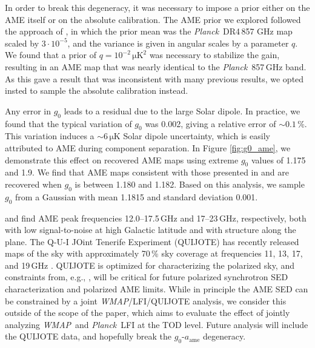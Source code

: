 \documentclass[twocolumn]{../../common/aa}
\def\WMAP{\emph{WMAP}}
\def\Planck{\emph{Planck}}
\begin{document}
In order to break this degeneracy, it was necessary to impose a prior either on the AME itself or on the absolute calibration. The AME prior we explored followed the approach of \citet{bp13}, in which the prior mean was the \Planck\ DR4\,857 GHz map scaled by $3\cdot10^{-5}$, and the variance is given in angular scales by a parameter $q$. We found that a prior of $q=10^{-2}\,\mathrm{\mu K}^2$ was necessary to stabilize the gain, resulting in an AME map that was nearly identical to the \Planck\ 857\,GHz band. As this gave a result that was inconsistent with many previous results, we opted insted to sample the absolute calibration instead.

Any error in $g_0$ leads to a residual due to the large Solar dipole. In practice, we found that the typical variation of $g_0$ was 0.002, giving a relative error of $\sim0.1\,\%$. This variation induces a $\sim6\,\mathrm{\mu K}$ Solar dipole uncertainty, which is easily attributed to AME during component separation. In Figure \ref{fig:g0_ame}, we demonstrate this effect on recovered AME maps using extreme $g_0$ values of 1.175 and 1.9. We find that AME maps consistent with those presented in \citet{bennett2012} and \citet{planck2014-a12} are recovered when $g_0$ is between 1.180 and 1.182. Based on this analysis, we sample $g_0$ from a Gaussian with mean 1.1815 and standard deviation 0.001.

\citet{bennett2012} and \citet{planck2014-a12} find AME peak frequencies 12.0--17.5\,GHz and 17--23\,GHz, respectively, both with low signal-to-noise at high Galactic latitude and with structure along the plane. The Q-U-I JOint Tenerife Experiment (QUIJOTE) has recently released maps of the sky with approximately 70\,\% sky coverage at frequencies 11, 13, 17, and 19\,GHz \citep{QUIJOTE_IV}. QUIJOTE is optimized for characterizing the polarized sky, and constraints from, e.g., \citet{QUIJOTE_VIII}, will be critical for future polarized synchrotron SED characterization and polarized AME limits. While in principle the AME SED can be constrained by a joint \WMAP/LFI/QUIJOTE analysis, we consider this outside of the scope of the paper, which aims to evaluate the effect of jointly analyzing \WMAP\ and \Planck\ LFI at the TOD level.  Future analysis will include the QUIJOTE data, and hopefully break the $g_0$-$a_\mathrm{ame}$ degeneracy.
\end{document}
